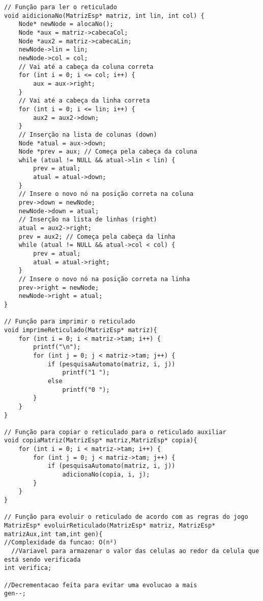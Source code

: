 \documentclass{article}
\begin{document}
\begin{verbatim}
// Função para ler o reticulado
void aidicionaNo(MatrizEsp* matriz, int lin, int col) {
    Node* newNode = alocaNo();
    Node *aux = matriz->cabecaCol;
    Node *aux2 = matriz->cabecaLin;
    newNode->lin = lin;
    newNode->col = col;
    // Vai até a cabeça da coluna correta
    for (int i = 0; i <= col; i++) {
        aux = aux->right;
    }
    // Vai até a cabeça da linha correta
    for (int i = 0; i <= lin; i++) {
        aux2 = aux2->down;
    }
    // Inserção na lista de colunas (down)
    Node *atual = aux->down;
    Node *prev = aux; // Começa pela cabeça da coluna
    while (atual != NULL && atual->lin < lin) {
        prev = atual;
        atual = atual->down;
    }
    // Insere o novo nó na posição correta na coluna
    prev->down = newNode;
    newNode->down = atual;
    // Inserção na lista de linhas (right)
    atual = aux2->right;
    prev = aux2; // Começa pela cabeça da linha
    while (atual != NULL && atual->col < col) {
        prev = atual;
        atual = atual->right;
    }
    // Insere o novo nó na posição correta na linha
    prev->right = newNode;
    newNode->right = atual;
}

// Função para imprimir o reticulado
void imprimeReticulado(MatrizEsp* matriz){
    for (int i = 0; i < matriz->tam; i++) {
        printf("\n");
        for (int j = 0; j < matriz->tam; j++) {
            if (pesquisaAutomato(matriz, i, j))
                printf("1 ");
            else
                printf("0 ");
        }
    }
}

// Função para copiar o reticulado para o reticulado auxiliar
void copiaMatriz(MatrizEsp* matriz,MatrizEsp* copia){
    for (int i = 0; i < matriz->tam; i++) {
        for (int j = 0; j < matriz->tam; j++) {
            if (pesquisaAutomato(matriz, i, j))
                adicionaNo(copia, i, j);
        }
    }
}

// Função para evoluir o reticulado de acordo com as regras do jogo
MatrizEsp* evoluirReticulado(MatrizEsp* matriz, MatrizEsp* matrizAux,int tam,int gen){ 
//Complexidade da funcao: O(n²)
  //Variavel para armazenar o valor das celulas ao redor da celula que está sendo verificada
int verifica;

//Decrementacao feita para evitar uma evolucao a mais
gen--;


\end{verbatim}
\end{document}
